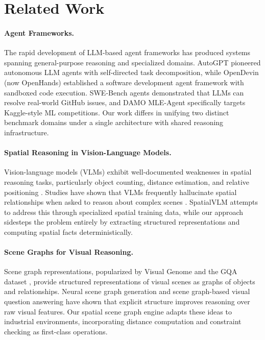 \documentclass[11pt]{article}
\begin{document}
\section{Related Work}
\label{sec:related}

\paragraph{Agent Frameworks.}
The rapid development of LLM-based agent frameworks has produced systems spanning general-purpose reasoning and specialized domains. AutoGPT \citep{autogpt2023} pioneered autonomous LLM agents with self-directed task decomposition, while OpenDevin (now OpenHands) \citep{hong2024opendevin} established a software development agent framework with sandboxed code execution. SWE-Bench agents \citep{jimenez2024swebench} demonstrated that LLMs can resolve real-world GitHub issues, and DAMO MLE-Agent \citep{zhang2024mleagent} specifically targets Kaggle-style ML competitions. Our work differs in unifying two distinct benchmark domains under a single architecture with shared reasoning infrastructure.

\paragraph{Spatial Reasoning in Vision-Language Models.}
Vision-language models (VLMs) exhibit well-documented weaknesses in spatial reasoning tasks, particularly object counting, distance estimation, and relative positioning \citep{liu2024llava, chen2024spatialvlm}. Studies have shown that VLMs frequently hallucinate spatial relationships when asked to reason about complex scenes \citep{li2023evaluating}. SpatialVLM \citep{chen2024spatialvlm} attempts to address this through specialized spatial training data, while our approach sidesteps the problem entirely by extracting structured representations and computing spatial facts deterministically.

\paragraph{Scene Graphs for Visual Reasoning.}
Scene graph representations, popularized by Visual Genome \citep{krishna2017visual} and the GQA dataset \citep{hudson2019gqa}, provide structured representations of visual scenes as graphs of objects and relationships. Neural scene graph generation \citep{xu2017scenegraph} and scene graph-based visual question answering \citep{hildebrandt2020scene} have shown that explicit structure improves reasoning over raw visual features. Our spatial scene graph engine adapts these ideas to industrial environments, incorporating distance computation and constraint checking as first-class operations.
\end{document}
